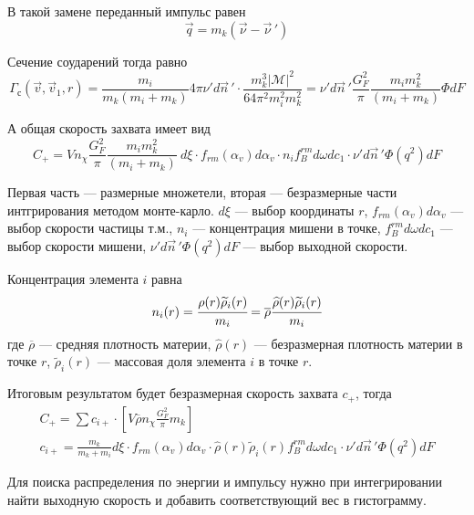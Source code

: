 В такой замене переданный импульс равен
\begin{equation*}
	\vec{q} = m_{k}\left( \vec{\nu} - {\vec{\nu}}\,' \right)
\end{equation*}

Сечение соударений тогда равно
\begin{equation*}
	\Gamma_{с}\left( {\vec{v},{\vec{v}}_{1},r} \right) = \frac{m_{i}}{m_{k}\left( m_{i} + m_{k} \right)}4\pi\nu'd\vec{n}\,' \cdot \frac{m_{k}^{3}\left| \mathcal{M} \right|^{2}}{64\pi^{2}m_{i}^{2}m_{k}^{2}} = \nu' d\vec{n}\,'\frac{G_{F}^{2}}{\pi}\frac{m_i m_{k}^{2}}{\left( m_{i} + m_{k} \right)}\Phi dF
\end{equation*}

А общая скорость захвата имеет вид
\begin{equation}
	\label{eq:capture_rate_result}
	C_+ = Vn_{\chi}\frac{G_{F}^{2}}{\pi}\frac{m_{i} m_{k}^{2}}{\left( {m_{i} + m_{k}} \right)}~d\xi \cdot f_{rm}\left( \alpha_{v} \right)d\alpha_{v} \cdot n_{i}f_{B}^{rm}d\omega dc_{1} \cdot \nu' d\vec{n}\,'\Phi\left( q^{2} \right)dF
\end{equation}

Первая часть --- размерные множетели, вторая --- безразмерные части интгрирования методом монте-карло. $d\xi$ --- выбор координаты $r$, $f_{rm}\left( \alpha_{v} \right)d\alpha_{v}$ --- выбор скорости частицы т.м., $n_{i}$ --- концентрация мишени в точке, $f_{B}^{rm}d\omega dc_{1}$ --- выбор скорости мишени, $\nu' d\vec{n}\,'\Phi\left( q^{2} \right)dF$ --- выбор выходной скорости.

Концентрация элемента $i$ равна
\begin{equation*}
	n_{i}(r) = \cfrac{\rho(r) \widetilde{\rho}_i(r)}{m_i} = 
	\overline{\rho}\cfrac{\widehat{\rho}(r) \widetilde{\rho}_i(r)}{m_i}
\end{equation*}
где $\overline{\rho}$ --- средняя плотность материи, $\widehat{\rho}(r)$ --- безразмерная плотность материи в точке $r$, $\widetilde{\rho}_i(r)$ --- массовая доля элемента $i$ в точке $r$.

Итоговым результатом будет безразмерная скорость захвата $c_+$, тогда
\begin{align*}
	C_+ = \sum{c_{i+}} \cdot \left[ V\overline{\rho}n_{\chi}\frac{G_{F}^{2}}{\pi}m_k
	\right]
	\\
	c_{i+} = \frac{m_k}{m_k+m_i}d\xi \cdot f_{rm}\left( \alpha_{v} \right)d\alpha_{v} \cdot \widehat{\rho}(r) \widetilde{\rho}_i(r) f_{B}^{rm}d\omega dc_{1} \cdot \nu' d\vec{n}\,'\Phi\left( q^{2} \right)dF
\end{align*}

Для поиска распределения по энергии и импульсу нужно при интегрировании  найти выходную скорость и добавить соответствующий вес в гистограмму.




